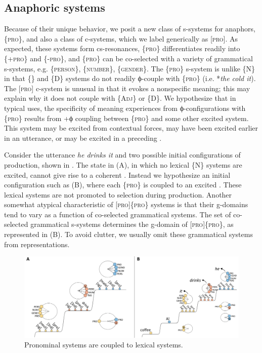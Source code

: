 \subsection{Anaphoric systems}

Because of their unique behavior, we posit a new class of s-systems for anaphors, \{\textsc{pro}\}, and also a class of  c-systems, which we label generically as [\textsc{pro}]. As expected, these systems form cs-resonances,  \{\textsc{pro}\} differentiates readily into \{+\textsc{pro}\} and \{-\textsc{pro}\}, and \{\textsc{pro}\} can be co-selected with a variety of grammatical s-systems, e.g. \{\textsc{person}\}, \{\textsc{number}\}, \{\textsc{gender}\}. The \{\textsc{pro}\} s-system is unlike \{N\} in that \{\} and \{D\} systems do not readily ϕ-couple with \{\textsc{pro}\} (i.e. *\textit{the cold it}). The [\textsc{pro}] c-system is unusual in that it evokes a nonspecific meaning; this may explain why it does not couple with \{A\textsc{dj}\} or \{D\}. We hypothesize that in typical uses, the specificity of meaning experiences from ϕ-configurations with \{\textsc{pro}\} results from +ϕ coupling between \{\textsc{pro}\} and some other excited system. This system may be excited from contextual forces, may have been excited earlier in an utterance, or may be excited in a  preceding . 

   Consider the utterance \textit{he drinks it} and two possible initial configurations of production, shown in {}. The state in (A), in which no lexical \{N\} systems are excited, cannot give rise to a coherent . Instead we hypothesize an initial configuration such as (B), where each \{\textsc{pro}\} is coupled to an excited . These lexical systems are not promoted to selection during production. Another somewhat atypical characteristic of [\textsc{pro}]\{\textsc{pro}\} systems is that their g-domains tend to vary as a function of co-selected grammatical systems. The set of co-selected grammatical s-systems determines the g-domain of [\textsc{pro}]\{\textsc{pro}\}, as represented in (B). To avoid clutter, we usually omit these grammatical systems from representations.   

  
\begin{figure}
\includegraphics[width=\textwidth]{figures/Tilsen-img152.png}
\caption{Pronominal systems are coupled to lexical systems.}
\label{fig:7:8}
\end{figure}
 

